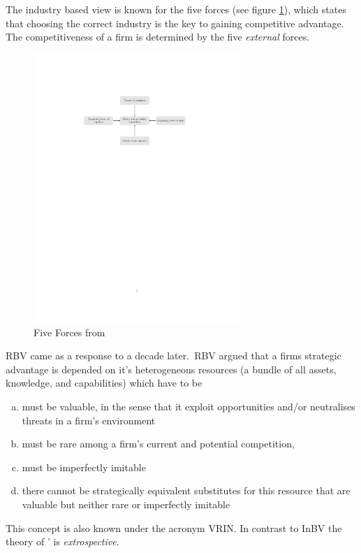 The industry based view is known for the five forces (see figure \ref{fig:5forces}), which states that choosing the correct industry is the key to gaining competitive advantage. The competitiveness of a firm is determined by the five \emph{external} forces.

\begin{figure}[htbp] 
	\centering
	\includegraphics[width=0.7\textwidth]{5forces}
 	\caption{Five Forces from \cite{Porter:1980}}
	\label{fig:5forces}
\end{figure}

\Gls{RBV} came as a response to \cite{Porter:1980} a decade later.~\Gls{RBV} argued that a firms strategic advantage is depended on it's heterogeneous resources (a bundle of all assets, knowledge, and capabilities) which have to be
\begin{enumerate}[(a)]
\item must be valuable, in the sense that it exploit opportunities and/or neutralises threats in a firm’s environment
\item must be rare among a firm’s current and potential competition, 
\item must be imperfectly imitable
\item  there cannot be strategically equivalent substitutes for this resource that are valuable but neither rare or imperfectly imitable 
\end{enumerate} 
This concept is also known under the acronym VRIN. In contrast to \gls{InBV} the theory of '\cite{Barney:1991} is \emph{extrospective}. 
\\

